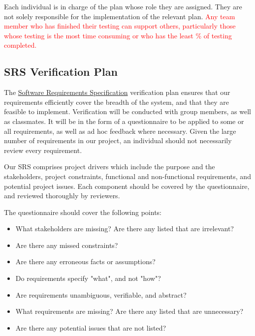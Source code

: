 \documentclass[12pt, titlepage]{article}
\begin{document}
Each individual is in charge of the plan whose role they are assigned. They are
not solely responsible for the implementation of the relevant plan.
\textcolor{red}{Any team member who has finished their testing can support
others, particularly those whose testing is the most time consuming or who has
the least \% of testing completed.} 

\subsection{SRS Verification Plan}
\label{sec:srs}
The
\href{https://github.com/parkd-app/park-d/blob/main/docs/SRS/SRS.pdf}{Software
Requirements Specification} verification plan ensures that our requirements
efficiently cover the breadth of the system, and that they are feasible to
implement. Verification will be conducted with group members, as well as
classmates. It will be in the form of a questionnaire to be applied to some or
all requirements, as well as ad hoc feedback where necessary. Given the large
number of requirements in our project, an individual should not necessarily
review every requirement.

Our SRS comprises project drivers which include the purpose and the
stakeholders, project constraints, functional and non-functional requirements,
and potential project issues. Each component should be covered by the
questionnaire, and reviewed thoroughly by reviewers.

The questionnaire should cover the following points:
\begin{itemize}
    \item What stakeholders are missing? Are there any listed that are
    irrelevant?
    \item Are there any missed constraints?
    \item Are there any erroneous facts or assumptions?
    \item Do requirements specify "what", and not "how"?
    \item Are requirements unambiguous, verifiable, and abstract?
    \item What requirements are missing? Are there any listed that are
    unnecessary?
    \item Are there any potential issues that are not listed?
\end{itemize}
\end{document}

